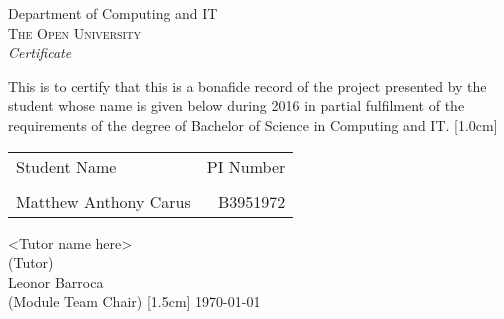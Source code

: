 \newpage
\thispagestyle{empty}

\begin{center}

\huge{Department of Computing and IT}\\[0.5cm]
\normalsize
\textsc{The Open University}\\[2.0cm]

\emph{\LARGE Certificate}\\[2.5cm]
\end{center}
\normalsize This is to certify that this is a bonafide record of the project
presented by the student whose name is given below during 2016 in partial fulfilment of the requirements of the degree of Bachelor of Science in Computing
and IT.
[1.0cm]
\begin{table}[h]
\centering
\begin{tabular}{lr}
Student Name & PI Number \\ \\ \hline

Matthew Anthony Carus & B3951972
\end{tabular}
\end{table}

\vfill


\begin{flushright}
<Tutor name here>\\
(Tutor)\\[1.5cm]
Leonor Barroca \\
(Module Team Chair)
[1.5cm]
\today
\end{flushright}